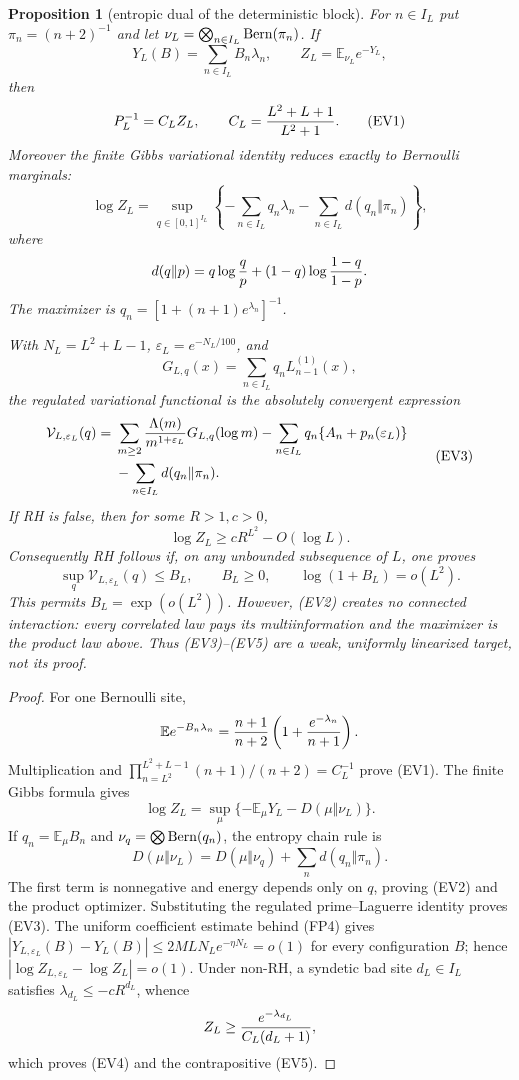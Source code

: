 \documentclass[11pt]{amsart}
\newtheorem{proposition}[theorem]{Proposition}
\theoremstyle{definition}
\theoremstyle{remark}
\theoremstyle{definition}
\begin{document}
\begin{proposition}[entropic dual of the deterministic block]
\label{prop:li-entropic-block}
For $n\in I_L$ put $\pi_n=(n+2)^{-1}$ and let
$\nu_L=\bigotimes_{n\in I_L}{\rm Bern}(\pi_n)$.  If
\[
 Y_L(B)=\sum_{n\in I_L}B_n\lambda_n,\qquad
 Z_L=\mathbb E_{\nu_L}e^{-Y_L},
\]
then
\[
 P_L^{-1}=C_LZ_L,\qquad
 C_L={L^2+L+1\over L^2+1}.                               \tag{EV1}
\]
Moreover the finite Gibbs variational identity reduces exactly to Bernoulli
marginals:
\[
\boxed{\quad
 \log Z_L
 =\sup_{q\in[0,1]^{I_L}}
 \left\{-\sum_{n\in I_L}q_n\lambda_n
 -\sum_{n\in I_L}d(q_n\Vert\pi_n)\right\},\quad}          \tag{EV2}
\]
where
\[
 d(q\Vert p)=q\log{q\over p}+(1-q)\log{1-q\over1-p}.
\]
The maximizer is $q_n=[1+(n+1)e^{\lambda_n}]^{-1}$.

With $N_L=L^2+L-1$, $\varepsilon_L=e^{-N_L/100}$, and
\[
 G_{L,q}(x)=\sum_{n\in I_L}q_nL_{n-1}^{(1)}(x),
\]
the regulated variational functional is the absolutely convergent expression
\[
\begin{aligned}
 \mathcal V_{L,\varepsilon_L}(q)
={}&\sum_{m\ge2}{\Lambda(m)\over m^{1+\varepsilon_L}}
       G_{L,q}(\log m)
 -\sum_{n\in I_L}q_n\{A_n+p_n(\varepsilon_L)\}\\
 &-\sum_{n\in I_L}d(q_n\Vert\pi_n).
\end{aligned}                                               \tag{EV3}
\]
If RH is false, then for some $R>1,c>0$,
\[
 \log Z_L\ge cR^{L^2}-O(\log L).                          \tag{EV4}
\]
Consequently RH follows if, on any unbounded subsequence of $L$, one proves
\[
 \sup_q\mathcal V_{L,\varepsilon_L}(q)\le B_L,\qquad
 B_L\ge0,\qquad \log(1+B_L)=o(L^2).                       \tag{EV5}
\]
This permits $B_L=\exp(o(L^2))$.  However, (EV2) creates no connected
interaction: every correlated law pays its multiinformation and the
maximizer is the product law above.  Thus (EV3)--(EV5) are a weak,
uniformly linearized target, not its proof.
\end{proposition}

\begin{proof}
For one Bernoulli site,
\[
 \mathbb E e^{-B_n\lambda_n}
 ={n+1\over n+2}\left(1+{e^{-\lambda_n}\over n+1}\right).
\]
Multiplication and
$\prod_{n=L^2}^{L^2+L-1}(n+1)/(n+2)=C_L^{-1}$ prove (EV1).
The finite Gibbs formula gives
\[
 \log Z_L=\sup_\mu\{-\mathbb E_\mu Y_L-D(\mu\Vert\nu_L)\}.
\]
If $q_n=\mathbb E_\mu B_n$ and
$\nu_q=\bigotimes{\rm Bern}(q_n)$, the entropy chain rule is
\[
 D(\mu\Vert\nu_L)=D(\mu\Vert\nu_q)
   +\sum_nd(q_n\Vert\pi_n).
\]
The first term is nonnegative and energy depends only on $q$, proving
(EV2) and the product optimizer.  Substituting the regulated
prime--Laguerre identity proves (EV3).  The uniform coefficient estimate
behind (FP4) gives
$|Y_{L,\varepsilon_L}(B)-Y_L(B)|\le
2MLN_Le^{-\eta N_L}=o(1)$ for every configuration $B$; hence
$|\log Z_{L,\varepsilon_L}-\log Z_L|=o(1)$.  Under non-RH, a syndetic bad site
$d_L\in I_L$ satisfies $\lambda_{d_L}\le-cR^{d_L}$, whence
\[
 Z_L\ge {e^{-\lambda_{d_L}}\over C_L(d_L+1)},
\]
which proves (EV4) and the contrapositive (EV5).
\end{proof}
\end{document}
